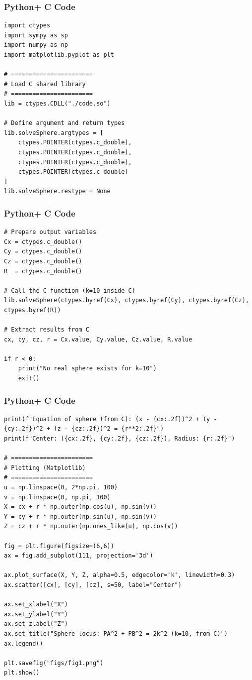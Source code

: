 \documentclass{beamer}
\begin{document}
\begin{frame}[fragile]
    \frametitle{Python+ C Code}
\begin{lstlisting}
import ctypes
import sympy as sp
import numpy as np
import matplotlib.pyplot as plt

# =======================
# Load C shared library
# =======================
lib = ctypes.CDLL("./code.so")

# Define argument and return types
lib.solveSphere.argtypes = [
    ctypes.POINTER(ctypes.c_double),
    ctypes.POINTER(ctypes.c_double),
    ctypes.POINTER(ctypes.c_double),
    ctypes.POINTER(ctypes.c_double)
]
lib.solveSphere.restype = None
\end{lstlisting}
\end{frame}

\begin{frame}[fragile]
    \frametitle{Python+ C Code}
\begin{lstlisting}
# Prepare output variables
Cx = ctypes.c_double()
Cy = ctypes.c_double()
Cz = ctypes.c_double()
R  = ctypes.c_double()

# Call the C function (k=10 inside C)
lib.solveSphere(ctypes.byref(Cx), ctypes.byref(Cy), ctypes.byref(Cz), ctypes.byref(R))

# Extract results from C
cx, cy, cz, r = Cx.value, Cy.value, Cz.value, R.value

if r < 0:
    print("No real sphere exists for k=10")
    exit()
\end{lstlisting}
\end{frame}

\begin{frame}[fragile]
    \frametitle{Python+ C Code}
\begin{lstlisting}
print(f"Equation of sphere (from C): (x - {cx:.2f})^2 + (y - {cy:.2f})^2 + (z - {cz:.2f})^2 = {r**2:.2f}")
print(f"Center: ({cx:.2f}, {cy:.2f}, {cz:.2f}), Radius: {r:.2f}")

# =======================
# Plotting (Matplotlib)
# =======================
u = np.linspace(0, 2*np.pi, 100)
v = np.linspace(0, np.pi, 100)
X = cx + r * np.outer(np.cos(u), np.sin(v))
Y = cy + r * np.outer(np.sin(u), np.sin(v))
Z = cz + r * np.outer(np.ones_like(u), np.cos(v))

fig = plt.figure(figsize=(6,6))
ax = fig.add_subplot(111, projection='3d')

ax.plot_surface(X, Y, Z, alpha=0.5, edgecolor='k', linewidth=0.3)
ax.scatter([cx], [cy], [cz], s=50, label="Center")

ax.set_xlabel("X")
ax.set_ylabel("Y")
ax.set_zlabel("Z")
ax.set_title("Sphere locus: PA^2 + PB^2 = 2k^2 (k=10, from C)")
ax.legend()

plt.savefig("figs/fig1.png")
plt.show()
\end{lstlisting}
\end{frame}
\end{document}

